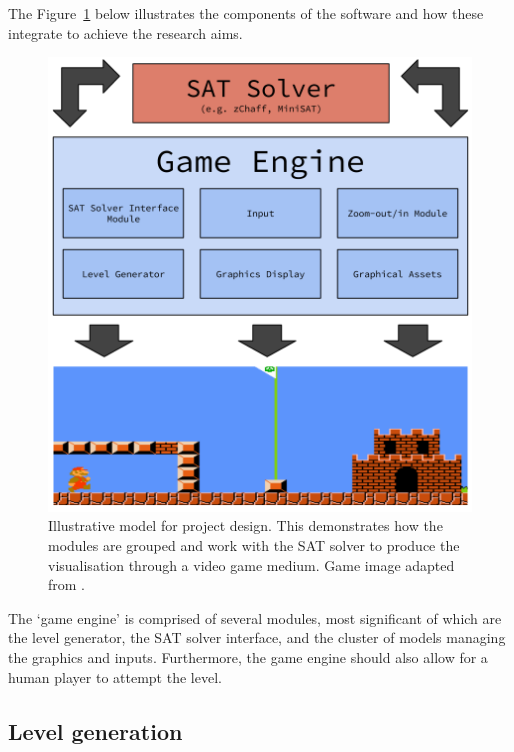\documentclass[11pt, a4paper, oneside]{report} %
\begin{document}
The Figure~\ref{project_design} below illustrates the components of the software and how these integrate to achieve the
research aims.


\begin{figure}[h!]

  \centering
    \includegraphics[scale=0.3]{diagram(2)}
  \caption{Illustrative model for project design. This demonstrates how the modules are grouped and work with the SAT solver to produce the visualisation through a video game medium. Game image adapted from \cite{Aloupis2012}.}
  \label{project_design}
\end{figure}

The `game engine' is comprised of several modules, most significant of which are
the level generator, the SAT solver interface, and the cluster of models
managing the graphics and inputs. Furthermore, the game engine should also allow
for a human player to attempt the level.

\subsection{Level generation}
\end{document}
